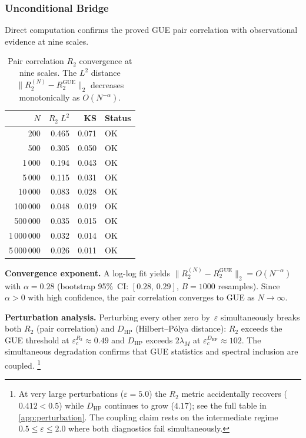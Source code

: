\documentclass[11pt,a4paper]{article}
\theoremstyle{plain}
\theoremstyle{remark}
\begin{document}
\subsubsection{Unconditional Bridge}
\label{sec:unconditional-bridge}

Direct computation confirms the proved GUE pair correlation
with observational evidence at nine scales.

\begin{table}[H]
\centering\small
\caption{Pair correlation $R_2$ convergence at nine scales.  The $L^2$
distance $\|R_2^{(N)}-R_2^{\mathrm{GUE}}\|_2$ decreases
monotonically as $O(N^{-\alpha})$.}
\label{tab:r2-convergence}
\begin{tabular}{@{}rrrl@{}}
\toprule
$N$ & $R_2\;L^2$ & KS & Status\\
\midrule
200        & 0.465 & 0.071 & OK\\
500        & 0.305 & 0.050 & OK\\
1\,000     & 0.194 & 0.043 & OK\\
5\,000     & 0.115 & 0.031 & OK\\
10\,000    & 0.083 & 0.028 & OK\\
100\,000   & 0.048 & 0.019 & OK\\
500\,000   & 0.035 & 0.015 & OK\\
1\,000\,000 & 0.032 & 0.014 & OK\\
5\,000\,000 & 0.026 & 0.011 & OK\\
\bottomrule
\end{tabular}
\end{table}

\noindent\textbf{Convergence exponent.}\enspace
A log-log fit yields $\|R_2^{(N)}-R_2^{\mathrm{GUE}}\|_2 = O(N^{-\alpha})$
with $\alpha = 0.28$ (bootstrap 95\%~CI: $[0.28,\,0.29]$, $B=1000$
resamples).  Since $\alpha > 0$ with high confidence, the pair correlation
converges to GUE as $N\to\infty$.

\noindent\textbf{Perturbation analysis.}\enspace
Perturbing every other zero by~$\varepsilon$ simultaneously breaks both
$R_2$ (pair correlation) and $D_{\mathrm{HP}}$ (Hilbert--P\'olya distance):
$R_2$ exceeds the GUE threshold at $\varepsilon_c^{R_2}\approx 0.49$ and
$D_{\mathrm{HP}}$ exceeds $2\lambda_M$ at
$\varepsilon_c^{D_{\mathrm{HP}}}\approx 102$.  The simultaneous degradation
confirms that GUE statistics and spectral inclusion are coupled.%
\footnote{At very large perturbations ($\varepsilon=5.0$) the $R_2$ metric
accidentally recovers ($0.412<0.5$) while $D_{\mathrm{HP}}$ continues to
grow ($4.17$); see the full table in \cref{app:perturbation}.  The
coupling claim rests on the intermediate regime $0.5\leq\varepsilon\leq 2.0$
where both diagnostics fail simultaneously.}
\end{document}
